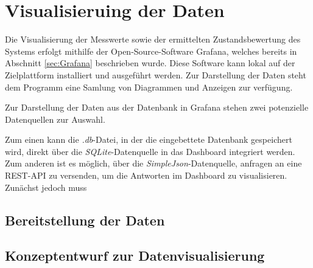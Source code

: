 \newpage
\section{Visualisieruing der Daten }\label{sec:Datenvisualisierung}

Die Visualisierung der Messwerte sowie der ermittelten Zustandsbewertung des Systems erfolgt mithilfe der Open-Source-Software Grafana, welches bereits in Abschnitt \ref{sec:Grafana} beschrieben wurde. Diese Software kann lokal auf der Zielplattform installiert und ausgeführt werden. Zur Darstellung der Daten steht dem Programm eine Samlung von Diagrammen und Anzeigen zur verfügung. 





Zur Darstellung der Daten aus der Datenbank in Grafana stehen zwei potenzielle Datenquellen zur Auswahl.




Zum einen kann die \textit{.db}-Datei, in der die eingebettete Datenbank gespeichert wird, direkt über die \textit{SQLite}-Datenquelle in das Dashboard integriert werden. Zum anderen ist es möglich, über die \textit{SimpleJson}-Datenquelle, anfragen an eine REST-API zu versenden, um die Antworten im Dashboard zu visualisieren.\\
Zunächst jedoch muss 

\subsection{Bereitstellung der Daten}
\subsection{Konzeptentwurf zur Datenvisualisierung}